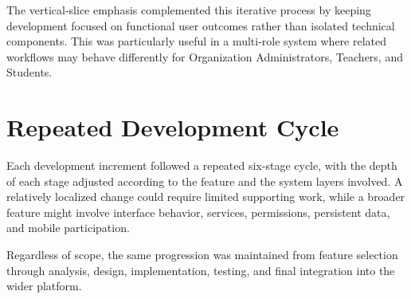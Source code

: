 The vertical-slice emphasis complemented this iterative process by keeping
development focused on functional user outcomes rather than isolated technical
components. This was particularly useful in a multi-role system where related
workflows may behave differently for Organization Administrators, Teachers,
and Students.

\section{Repeated Development Cycle}\label{sec:development_workflow_structure}

Each development increment followed a repeated six-stage cycle, with the depth
of each stage adjusted according to the feature and the system layers involved.
A relatively localized change could require limited supporting work, while a
broader feature might involve interface behavior, services, permissions,
persistent data, and mobile participation.

Regardless of scope, the same progression was maintained from feature selection
through analysis, design, implementation, testing, and final integration into
the wider platform.

